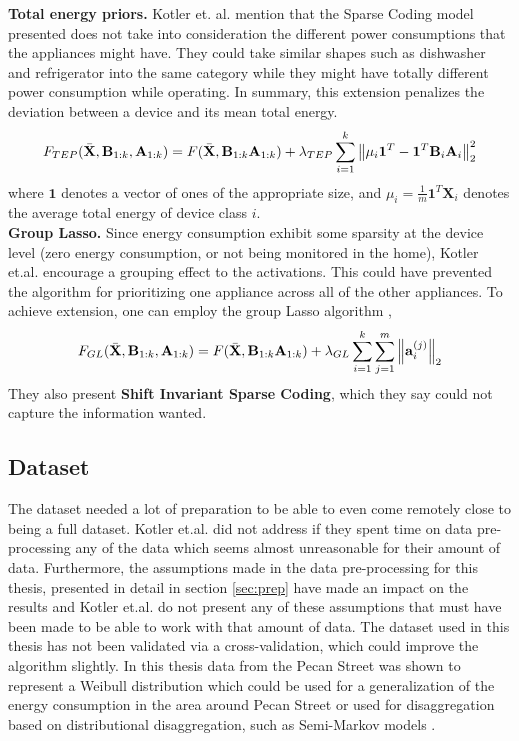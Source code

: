 \textbf{Total energy priors.} Kotler et. al. mention that the Sparse Coding model presented does not take into consideration the different power consumptions that the appliances might have. They could take similar shapes such as dishwasher and refrigerator into the same category while they might have totally different power consumption while operating. In summary, this extension penalizes the deviation between a device and its mean total energy. \cite{DDSC}
\vspace{0.1in}
\[
F_{TEP}(\bar{\mathbf{X}},\mathbf{B}_{1:k},\mathbf{A}_{1:k}) = F(\bar{\mathbf{X}},\mathbf{B}_{1:k} \mathbf{A}_{1:k}) + \lambda_{TEP}\sum_{i=1}^k \left\lVert\mu_i\mathbf{1}^T-\mathbf{1}^T\mathbf{B}_i\mathbf{A}_i\right\rVert^2_2
\]
where $\mathbf{1}$ denotes a vector of ones of the appropriate size, and $\mu_i = \frac{1}{m} \mathbf{1}^T \mathbf{X}_i$ denotes the average total energy of device class $i$.
\vspace{0.1in}
\\
\textbf{Group Lasso.} Since energy consumption exhibit some sparsity at the device level (zero energy consumption, or not being monitored in the home), Kotler et.al. encourage a grouping effect to the activations. This could have prevented the algorithm for prioritizing one appliance across all of the other appliances. To achieve extension, one can employ the group Lasso algorithm \cite{grouplasso}, 
\vspace{0.1in}
\[
F_{GL}(\bar{\mathbf{X}},\mathbf{B}_{1:k},\mathbf{A}_{1:k}) = F(\bar{\mathbf{X}},\mathbf{B}_{1:k} \mathbf{A}_{1:k}) + \lambda_{GL}\sum_{i=1}^k \sum_{j=1}^m \left\lVert\mathbf{a}_i^{(j)}\right\rVert_2
\]
They also present \textbf{Shift Invariant Sparse Coding}, which they say could not capture the information wanted. \cite{DDSC}

\subsection{Dataset}
\label{sec:dataset}

The dataset needed a lot of preparation to be able to even come remotely close to being a full dataset. Kotler et.al. did not address if they spent time on data pre-processing any of the data which seems almost unreasonable for their amount of data. Furthermore, the assumptions made in the data pre-processing for this thesis, presented in detail in section \ref{sec:prep} have made an impact on the results and Kotler et.al. do not present any of these assumptions that must have been made to be able to work with that amount of data. The dataset used in this thesis has not been validated via a cross-validation, which could improve the algorithm slightly.
In this thesis data from the Pecan Street was shown to represent a Weibull distribution which could be used for a generalization of the energy consumption in the area around Pecan Street or used for disaggregation based on distributional disaggregation, such as Semi-Markov models \cite{kotler2}.


